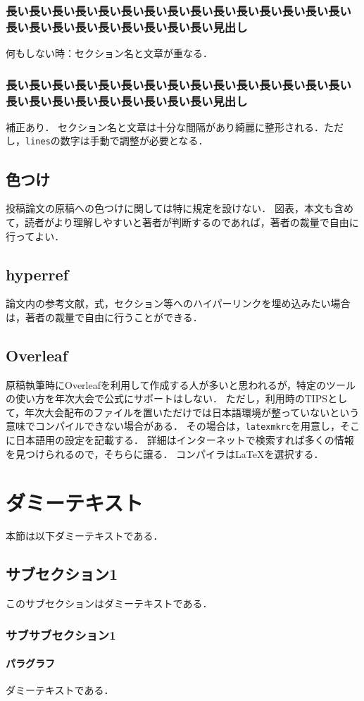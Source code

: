 \documentclass[
  platex, dvipdfmx,  %
]{nlp2024}
\newcommand{\code}[1]{\texttt{#1}}
\begin{document}
\subsubsection{長い長い長い長い長い長い長い長い長い長い長い長い長い長い長い長い長い長い長い長い長い長い長い長い見出し}

何もしない時：セクション名と文章が重なる．


\subsubsection{長い長い長い長い長い長い長い長い長い長い長い長い長い長い長い長い長い長い長い長い長い長い長い長い見出し}
\restoresection

補正あり．
セクション名と文章は十分な間隔があり綺麗に整形される．ただし，\code{lines}の数字は手動で調整が必要となる．


\subsection{色つけ}
投稿論文の原稿への色つけに関しては特に規定を設けない．
図表，本文も含めて，読者がより理解しやすいと著者が判断するのであれば，著者の裁量で自由に行ってよい．

\subsection{hyperref}
論文内の参考文献，式，セクション等へのハイパーリンクを埋め込みたい場合は，著者の裁量で自由に行うことができる．


\subsection{Overleaf}
原稿執筆時にOverleafを利用して作成する人が多いと思われるが，特定のツールの使い方を年次大会で公式にサポートはしない．
ただし，利用時のTIPSとして，年次大会配布のファイルを置いただけでは日本語環境が整っていないという意味でコンパイルできない場合がある．
その場合は，\code{latexmkrc}を用意し，そこに日本語用の設定を記載する．
詳細はインターネットで検索すれば多くの情報を見つけられるので，そちらに譲る．
コンパイラはLaTeXを選択する．

\section{ダミーテキスト}
本節は以下ダミーテキストである．

\subsection{サブセクション1}
このサブセクションはダミーテキストである．

\subsubsection{サブサブセクション1}

\paragraph{パラグラフ}
ダミーテキストである．
\end{document}

